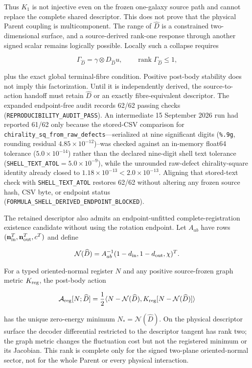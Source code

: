 \documentclass[11pt]{article}
\begin{document}
Thus $K_1$ is not injective even on the frozen one-galaxy source path and
cannot replace the complete shared descriptor.  This does not prove that the
physical Parent coupling is multicomponent.  The range of $\widehat D$ is a
constrained two-dimensional surface, and a source-derived rank-one response
through another signed scalar remains logically possible.  Locally such a
collapse requires

\[
\Gamma_{\widehat D}=\gamma\otimes D_{\widehat D}u,
\qquad \operatorname{rank}\Gamma_{\widehat D}\leq1,
\]

plus the exact global terminal-fibre condition.  Positive post-body stability
does not imply this factorization.  Until it is independently derived, the
source-to-action handoff must retain $\widehat D$ or an exactly fibre-equivalent
descriptor. The expanded endpoint-free audit records 62/62 passing checks
(\texttt{REPRODUCIBILITY\_AUDIT\_PASS}). An intermediate 15 September 2026 run
had reported 61/62 only because the stored-CSV comparison for
\texttt{chirality\_sq\_from\_raw\_defects}---serialized at nine significant
digits (\texttt{\%.9g}, rounding residual $4.85\times 10^{-12}$)--was checked
against an in-memory float64 tolerance ($5.0\times 10^{-14}$) rather than the
declared nine-digit shell text tolerance
(\texttt{SHELL\_TEXT\_ATOL}$=5.0\times 10^{-9}$), while the unrounded
raw-defect chirality-square identity already closed to
$1.18\times 10^{-13}<2.0\times 10^{-13}$. Aligning that stored-text check with
\texttt{SHELL\_TEXT\_ATOL} restores 62/62 without altering any frozen source
hash, CSV byte, or endpoint status
(\texttt{FORMULA\_SHELL\_DERIVED\_ENDPOINT\_BLOCKED}).

The retained descriptor also admits an endpoint-unfitted
complete-registration existence candidate without using the rotation
endpoint.  Let
$A_{ab}$ have rows
$(\mathbf n_{\rm in}^{T},\mathbf n_{\rm out}^{T},c^{T})$ and define

\[
\mathcal N(\widehat D)
=A_{ab}^{-1}
(1-d_{\rm in},1-d_{\rm out},\chi)^T.
\]

For a typed oriented-normal register $N$ and any positive source-frozen graph
metric $K_{\rm reg}$, the post-body action

\[
\mathcal A_{\rm reg}[N;\widehat D]
=\frac12
\langle N-\mathcal N(\widehat D),
K_{\rm reg}[N-\mathcal N(\widehat D)]\rangle
\]

has the unique zero-energy minimum
$N_*=\mathcal N(\widehat D)$.  On the physical descriptor surface the decoder
differential restricted to the descriptor tangent has rank two; the graph
metric changes the fluctuation cost but not the registered minimum or its
Jacobian.  This rank is complete
only for the signed two-plane oriented-normal sector, not for the whole
Parent or every physical interaction.
\end{document}
